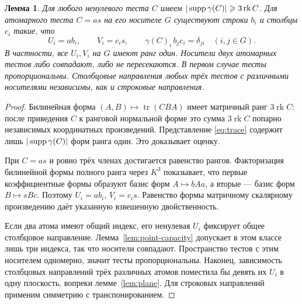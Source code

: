 \documentclass[11pt,a4paper]{article}
\numberwithin{equation}{section}
\theoremstyle{plain}
\newtheorem{lemma}[theorem]{Лемма}
\theoremstyle{definition}
\DeclareMathOperator{\tr}{tr}\DeclareMathOperator{\rk}{rk}
\begin{document}
\begin{lemma}\label{lem:atom}
Для любого ненулевого теста $C$ имеем
$|\supp\gamma(C)|\geqs3\rk C$.
Для атомарного теста $C=as$ на его носителе $G$ существуют строки
$b_i$ и столбцы $c_i$ такие, что
\[
 U_i=ab_i,\qquad V_i=c_i s,
 \qquad \gamma(C)_i\, b_jc_i=\delta_{ji}\quad(i,j\in G).
\]
В частности, все $U_i,V_i$ на $G$ имеют ранг один.
Носители двух атомарных тестов либо совпадают, либо не пересекаются.
В первом случае тесты пропорциональны. Столбцовые направления любых трёх
тестов с различными носителями независимы, как и строковые направления.
\end{lemma}
\begin{proof}
Билинейная форма $(A,B)\mapsto\tr(CBA)$ имеет матричный ранг
$3\rk C$: после приведения $C$ к ранговой нормальной форме это сумма
$3\rk C$ попарно независимых координатных произведений.
Представление \eqref{eq:trace} содержит лишь $|\operatorname{supp}\gamma(C)|$
форм ранга один. Это доказывает оценку.

При $C=as$ и ровно трёх членах достигается равенство рангов.
Факторизация билинейной формы полного ранга через $K^3$ показывает,
что первые коэффициентные формы образуют базис форм $A\mapsto bAa$,
а вторые --- базис форм $B\mapsto sBc$. Поэтому $U_i=ab_i$,
$V_i=c_i s$. Равенство формы матричному скалярному произведению даёт
указанную взвешенную двойственность.

Если два атома имеют общий индекс, его ненулевая $U_i$ фиксирует
общее столбцовое направление. Лемма~\ref{lem:point-capacity} допускает
в этом классе лишь три индекса, так что носители совпадают.
Пространство тестов с этим носителем одномерно, значит тесты
пропорциональны. Наконец, зависимость столбцовых направлений трёх различных
атомов поместила бы девять их $U_i$ в одну плоскость, вопреки
лемме~\ref{lem:plane}. Для строковых направлений применим симметрию
с транспонированием.
\end{proof}
\end{document}
